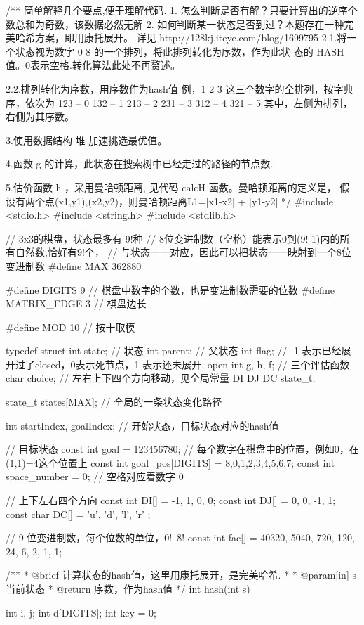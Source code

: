 \begin{Codex}[label=eight_digits_astar.c]
/**
 简单解释几个要点,便于理解代码.
 1. 怎么判断是否有解？只要计算出的逆序个数总和为奇数，该数据必然无解
 2. 如何判断某一状态是否到过？本题存在一种完美哈希方案，即用康托展开。
    详见 http://128kj.iteye.com/blog/1699795
    2.1.将一个状态视为数字 0-8 的一个排列，将此排列转化为序数，作为此状
 态的 HASH 值。0表示空格.转化算法此处不再赘述。

    2.2.排列转化为序数，用序数作为hash值
    例，1 2 3 这三个数字的全排列，按字典序，依次为
 123 -- 0
 132 -- 1
 213 -- 2
 231 -- 3
 312 -- 4
 321 -- 5
 其中，左侧为排列，右侧为其序数。
 
 3.使用数据结构 堆 加速挑选最优值。
 
 4.函数 g 的计算，此状态在搜索树中已经走过的路径的节点数.
 
 5.估价函数 h ，采用曼哈顿距离, 见代码 calcH 函数。曼哈顿距离的定义是，
 假设有两个点(x1,y1),(x2,y2)，则曼哈顿距离L1=|x1-x2| + |y1-y2|
 */
#include <stdio.h>
#include <string.h>
#include <stdlib.h>

// 3x3的棋盘，状态最多有 9!种
// 8位变进制数（空格）能表示0到(9!-1)内的所有自然数,恰好有9!个，
// 与状态一一对应，因此可以把状态一一映射到一个8位变进制数
#define     MAX         362880

#define DIGITS 9 // 棋盘中数字的个数，也是变进制数需要的位数
#define     MATRIX_EDGE 3       // 棋盘边长

#define     MOD         10      // 按十取模

typedef struct {
    int state; // 状态
    int parent;     // 父状态
    int flag;   // -1 表示已经展开过了closed，0表示死节点，1 表示还未展开, open
    int g, h, f; // 三个评估函数
    char choice;  // 左右上下四个方向移动，见全局常量 DI DJ DC
} state_t;

state_t states[MAX];  // 全局的一条状态变化路径

int  startIndex, goalIndex; // 开始状态，目标状态对应的hash值

// 目标状态
const int goal = 123456780;
// 每个数字在棋盘中的位置，例如0，在(1,1)=4这个位置上
const int goal_pos[DIGITS] = {8,0,1,2,3,4,5,6,7};
const int space_number = 0; // 空格对应着数字 0

// 上下左右四个方向
const int DI[] = {-1, 1, 0, 0};
const int DJ[] = {0, 0, -1, 1};
const char DC[] = { 'u', 'd', 'l', 'r' };

// 9 位变进制数，每个位数的单位，0!~8!
const int fac[] = {40320, 5040, 720, 120, 24, 6, 2, 1, 1};

/**
 * @brief 计算状态的hash值，这里用康托展开，是完美哈希.
 *
 * @param[in] s 当前状态
 * @return 序数，作为hash值
 */
int hash(int s) {
    int i, j;
    int d[DIGITS];
    int key = 0;

}
\end{Codex}
